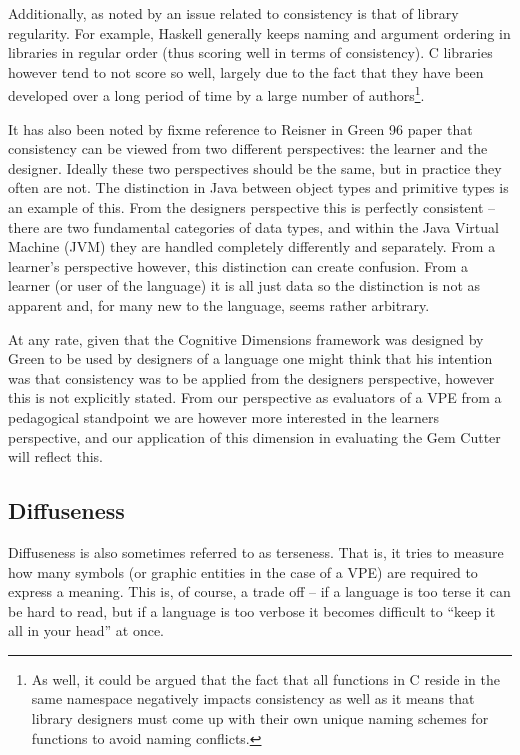 Additionally, as noted by \cite{Kelso02} an issue related to consistency is that of library regularity.  For example, Haskell generally keeps naming and argument ordering in libraries in regular order (thus scoring well in terms of consistency).  C libraries however tend to not score so well, largely due to the fact that they have been developed over a long period of time by a large number of authors\footnote{As well, it could be argued that the fact that all functions in C reside in the same namespace negatively impacts consistency as well as it means that library designers must come up with their own unique naming schemes for functions to avoid naming conflicts.}.

It has also been noted by fixme reference to Reisner in Green 96 paper that consistency can be viewed from two different perspectives: the learner and the designer.  Ideally these two perspectives should be the same, but in practice they often are not.  The distinction in Java between object types and primitive types is an example of this.  From the designers perspective this is perfectly consistent -- there are two fundamental categories of data types, and within the Java Virtual Machine (JVM) they are handled completely differently and separately.  From a learner's perspective however, this distinction can create confusion.  From a learner (or user of the language) it is all just data so the distinction is not as apparent and, for many new to the language, seems rather arbitrary.

At any rate, given that the Cognitive Dimensions framework was designed by Green to be used by designers of a language one might think that his intention was that consistency was to be applied from the designers perspective, however this is not explicitly stated.  From our perspective as evaluators of a VPE from a pedagogical standpoint we are however more interested in the learners perspective, and our application of this dimension in evaluating the Gem Cutter will reflect this.

\subsection{Diffuseness}
\label{diffusenessoutline}

Diffuseness is also sometimes referred to as terseness.  That is, it tries to measure how many symbols (or graphic entities in the case of a VPE) are required to express a meaning.  This is, of course, a trade off -- if a language is too terse it can be hard to read, but if a language is too verbose it becomes difficult to ``keep it all in your head'' at once.


